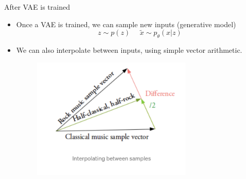 \documentclass[handout,aspectratio=169]{beamer}
\begin{document}
\begin{frame}{After VAE is trained}

  \begin{itemize}
  \item Once a VAE is trained, we can sample new inputs (generative model)
    $$
z\sim p(z)\ \ \ \ \ \     \tilde x \sim p_\theta(x | z)
    $$

  \item We can also interpolate between inputs, using simple vector arithmetic.
    \begin{figure}
\includegraphics[width=3in]{pics/inter-vae.png}
    \end{figure}
  \end{itemize}
\end{frame}


%
%
%
%
%
\end{document}
